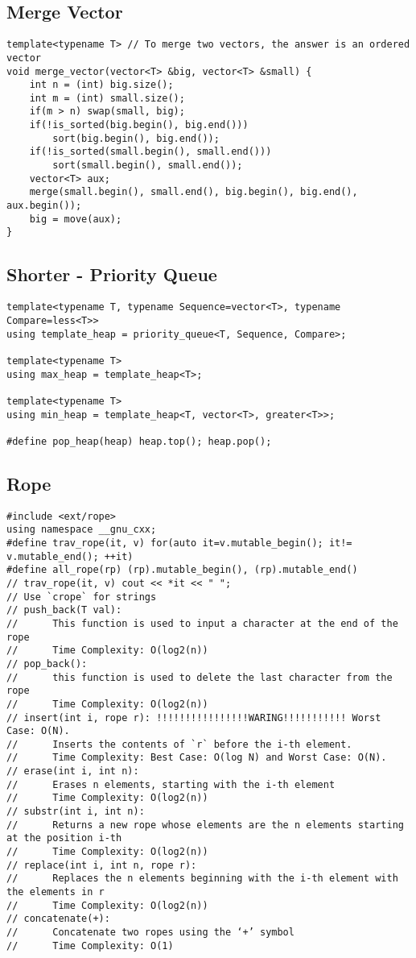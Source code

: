 \documentclass[10pt,letterpaper,twocolumn,twosided]{article}
\begin{document}
\subsection{Merge Vector}
\begin{lstlisting}
template<typename T> // To merge two vectors, the answer is an ordered vector
void merge_vector(vector<T> &big, vector<T> &small) {
    int n = (int) big.size();
    int m = (int) small.size();
    if(m > n) swap(small, big);
    if(!is_sorted(big.begin(), big.end()))
        sort(big.begin(), big.end());
    if(!is_sorted(small.begin(), small.end()))
        sort(small.begin(), small.end());
    vector<T> aux;
    merge(small.begin(), small.end(), big.begin(), big.end(), aux.begin());
    big = move(aux);
}
\end{lstlisting}

\subsection{Shorter - Priority Queue}
\begin{lstlisting}
template<typename T, typename Sequence=vector<T>, typename Compare=less<T>>
using template_heap = priority_queue<T, Sequence, Compare>;

template<typename T>
using max_heap = template_heap<T>;

template<typename T>
using min_heap = template_heap<T, vector<T>, greater<T>>;

#define pop_heap(heap) heap.top(); heap.pop();
\end{lstlisting}

\subsection{Rope}
\begin{lstlisting}
#include <ext/rope>
using namespace __gnu_cxx;
#define trav_rope(it, v) for(auto it=v.mutable_begin(); it!= v.mutable_end(); ++it)
#define all_rope(rp) (rp).mutable_begin(), (rp).mutable_end()
// trav_rope(it, v) cout << *it << " ";
// Use `crope` for strings
// push_back(T val): 
//      This function is used to input a character at the end of the rope
//      Time Complexity: O(log2(n))
// pop_back():
//      this function is used to delete the last character from the rope
//      Time Complexity: O(log2(n))
// insert(int i, rope r): !!!!!!!!!!!!!!!!WARING!!!!!!!!!!! Worst Case: O(N).
//      Inserts the contents of `r` before the i-th element.
//      Time Complexity: Best Case: O(log N) and Worst Case: O(N). 
// erase(int i, int n):
//      Erases n elements, starting with the i-th element
//      Time Complexity: O(log2(n))
// substr(int i, int n):
//      Returns a new rope whose elements are the n elements starting at the position i-th
//      Time Complexity: O(log2(n))
// replace(int i, int n, rope r):
//      Replaces the n elements beginning with the i-th element with the elements in r
//      Time Complexity: O(log2(n))
// concatenate(+):
//      Concatenate two ropes using the ‘+’ symbol
//      Time Complexity: O(1)
\end{lstlisting}
\end{document}
